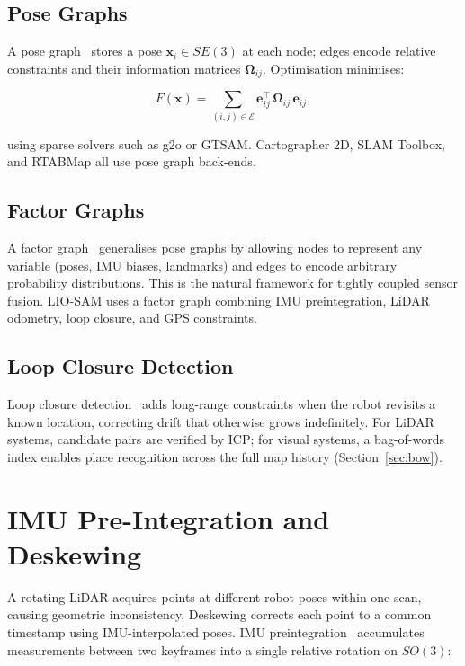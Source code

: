 \subsection{Pose Graphs}

A pose graph~\cite{grisetti2010tutorial} stores a pose $\mathbf{x}_i \in SE(3)$
at each node; edges encode relative constraints and their information matrices
$\boldsymbol{\Omega}_{ij}$. Optimisation minimises:

\begin{equation}
  F(\mathbf{x}) = \sum_{(i,j)\in\mathcal{E}}
    \mathbf{e}_{ij}^\top\, \boldsymbol{\Omega}_{ij}\, \mathbf{e}_{ij},
  \label{eq:pose_graph}
\end{equation}

\noindent using sparse solvers such as g2o or GTSAM. Cartographer 2D, SLAM
Toolbox, and RTABMap all use pose graph back-ends.

\subsection{Factor Graphs}

A factor graph~\cite{cadena2016past} generalises pose graphs by allowing nodes
to represent any variable (poses, IMU biases, landmarks) and edges to encode
arbitrary probability distributions.
This is the natural framework for tightly coupled sensor fusion.
LIO-SAM uses a factor graph combining IMU preintegration, LiDAR odometry, loop
closure, and GPS constraints.

\subsection{Loop Closure Detection}

Loop closure detection~\cite{cadena2016past} adds long-range constraints when
the robot revisits a known location, correcting drift that otherwise grows
indefinitely.
For LiDAR systems, candidate pairs are verified by ICP; for visual systems, a
bag-of-words index enables place recognition across the full map history
(Section~\ref{sec:bow}).

\section{IMU Pre-Integration and Deskewing}

A rotating LiDAR acquires points at different robot poses within one scan,
causing geometric inconsistency. Deskewing corrects each point to a common
timestamp using IMU-interpolated poses.
IMU preintegration~\cite{forster2017manifold} accumulates measurements between
two keyframes into a single relative rotation on $SO(3)$:

